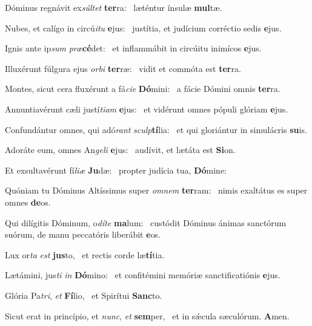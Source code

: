 \item Dóminus regnávit ex\textit{súltet} \textbf{ter}ra:~\psstar{} læténtur ínsulæ \textbf{mul}tæ.
\item Nubes, et calígo in circú\textit{itu} \textbf{e}jus:~\psstar{} justítia, et judícium corréctio sedis \textbf{e}jus.
\item Ignis ante ip\textit{sum} \textit{præ}\textbf{cé}det:~\psstar{} et inflammábit in circúitu inimícos \textbf{e}jus.
\item Illuxérunt fúlgura ejus \textit{orbi} \textbf{ter}ræ:~\psstar{} vidit et commóta est \textbf{ter}ra.
\item Montes, sicut cera fluxérunt a fá\textit{cie} \textbf{Dó}mini:~\psstar{} a fácie Dómini omnis \textbf{ter}ra.
\item Annuntiavérunt cæli justí\textit{tiam} \textbf{e}jus:~\psstar{} et vidérunt omnes pópuli glóriam \textbf{e}jus.
\item Confundántur omnes, qui adó\textit{rant} \textit{sculp}\textbf{tí}lia:~\psstar{} et qui gloriántur in simulácris \textbf{su}is.
\item Adoráte eum, omnes An\textit{geli} \textbf{e}jus:~\psstar{} audívit, et lætáta est \textbf{Si}on.
\item Et exsultavérunt fí\textit{liæ} \textbf{Ju}dæ:~\psstar{} propter judícia tua, \textbf{Dó}mine:
\item Quóniam tu Dóminus Altíssimus super \textit{omnem} \textbf{ter}ram:~\psstar{} nimis exaltátus es super omnes \textbf{de}os.
\item Qui dilígitis Dóminum, o\textit{díte} \textbf{ma}lum:~\psstar{} custódit Dóminus ánimas sanctórum suórum, de manu peccatóris liberábit \textbf{e}os.
\item Lux or\textit{ta} \textit{est} \textbf{jus}to,~\psstar{} et rectis corde læ\textbf{tí}tia.
\item Lætámini, jus\textit{ti} \textit{in} \textbf{Dó}mino:~\psstar{} et confitémini memóriæ sanctificatiónis \textbf{e}jus.
\item Glória Pa\textit{tri}, \textit{et} \textbf{Fí}lio,~\psstar{} et Spirítui \textbf{Sanc}to.
\item Sicut erat in princípio, et \textit{nunc}, \textit{et} \textbf{sem}per,~\psstar{} et in sǽcula sæculórum. \textbf{A}men.